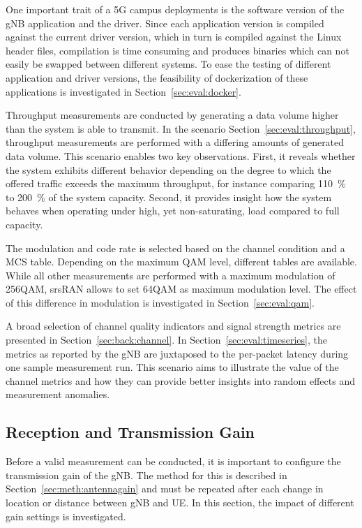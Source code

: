 One important trait of a 5G campus deployments is the software version of the \gls{gNB} application and the driver.
Since each application version is compiled against the current driver version, which in turn is compiled against
the Linux header files, compilation is time consuming and produces binaries which can not easily be
swapped between different systems.
To ease the testing of different application and driver versions, the feasibility of dockerization of these
applications is investigated in Section~\ref{sec:eval:docker}.

Throughput measurements are conducted by generating a data volume higher than the system is able to transmit.
In the scenario Section~\ref{sec:eval:throughput}, throughput measurements are performed with a differing amounts
of generated data volume.
This scenario enables two key observations.
First, it reveals whether the system exhibits different behavior depending on the degree to which the offered traffic
exceeds the maximum throughput, for instance comparing \SI{110}{\percent} to \SI{200}{\percent} of the system capacity.
Second, it provides insight how the system behaves when operating under high, yet non-saturating, load compared to full capacity.

The modulation and code rate is selected based on the channel condition and a \gls{MCS} table.
Depending on the maximum \gls{QAM} level, different tables are available.
While all other measurements are performed with a maximum modulation of 256\gls{QAM}, srsRAN allows to
set 64\gls{QAM} as maximum modulation level.
The effect of this difference in modulation is investigated in Section~\ref{sec:eval:qam}.

A broad selection of channel quality indicators and signal strength metrics are presented in Section~\ref{sec:back:channel}.
In Section~\ref{sec:eval:timeseries}, the metrics as reported by the \gls{gNB} are juxtaposed to the per-packet latency
during one sample measurement run.
This scenario aims to illustrate the value of the channel metrics and how they can provide better insights into random effects and measurement anomalies.


\subsection{Reception and Transmission Gain}\label{sec:eval:gain}

Before a valid measurement can be conducted, it is important to configure the transmission gain of the \gls{gNB}.
The method for this is described in Section~\ref{sec:meth:antennagain} and must be repeated after each
change in location or distance between \gls{gNB} and \gls{UE}.
In this section, the impact of different gain settings is investigated.

